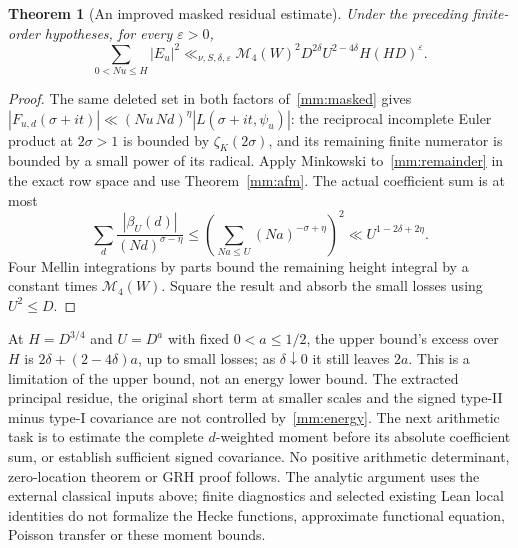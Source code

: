 \documentclass[11pt]{article}
\newtheorem{theorem}{Theorem}
\begin{document}
\begin{theorem}[An improved masked residual estimate]
\label{mm:residual}
Under the preceding finite-order hypotheses, for every $\varepsilon>0$,
\begin{equation}\label{mm:energy}
 \sum_{0<Nu\le H}|E_u|^2
 \ll_{\nu,S,\delta,\varepsilon}
 \mathcal M_4(W)^2D^{2\delta}U^{2-4\delta}H(HD)^\varepsilon.
\end{equation}
\end{theorem}
\begin{proof}
The same deleted set in both factors of~\eqref{mm:masked} gives
$|F_{u,d}(\sigma+it)|\ll (Nu\,Nd)^\eta|L(\sigma+it,\psi_u)|$:
the reciprocal incomplete Euler product at $2\sigma>1$ is bounded
by $\zeta_K(2\sigma)$, and its remaining finite numerator is bounded
by a small power of its radical. Apply Minkowski to~\eqref{mm:remainder}
in the exact row space and use Theorem~\ref{mm:afm}. The actual coefficient
sum is at most
\[
 \sum_d\frac{|\beta_U(d)|}{(Nd)^{\sigma-\eta}}
 \le\left(\sum_{Na\le U}(Na)^{-\sigma+\eta}\right)^2
 \ll U^{1-2\delta+2\eta}.
\]
Four Mellin integrations by parts bound the remaining height integral
by a constant times $\mathcal M_4(W)$. Square the result and absorb
the small losses using $U^2\le D$.
\end{proof}

At $H=D^{3/4}$ and $U=D^a$ with fixed $0<a\le1/2$, the upper bound's excess
over $H$ is $2\delta+(2-4\delta)a$, up to small losses; as
$\delta\downarrow0$ it still leaves $2a$. This is a limitation of the
upper bound, not an energy lower bound. The extracted principal residue,
the original short term at smaller scales and the signed type-II minus
type-I covariance are not controlled by~\eqref{mm:energy}. The next
arithmetic task is to estimate the complete $d$-weighted moment before
its absolute coefficient sum, or establish sufficient signed covariance.
No positive arithmetic determinant, zero-location theorem or GRH proof
follows. The analytic argument uses the external classical inputs above;
finite diagnostics and selected existing Lean local identities do not
formalize the Hecke functions, approximate functional equation, Poisson
transfer or these moment bounds.
\end{document}
